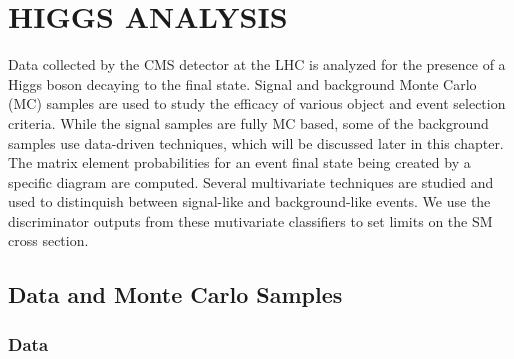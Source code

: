%
%
%



\chapter{\texorpdfstring{\uppercase {Higgs Analysis}}{Higgs Analysis}}
\label{ch:analysis}

Data collected by the CMS detector at the LHC is analyzed for the presence of a Higgs boson decaying to the \lvjj final state.
Signal and background Monte Carlo (MC) samples are used to study the efficacy of various object and event selection criteria.
While the signal samples are fully MC based, some of the background samples use data-driven techniques, which will be discussed later in this chapter.
The matrix element probabilities for an event final state being created by a specific diagram are computed.
Several multivariate techniques are studied and used to distinquish between signal-like and background-like events.
We use the discriminator outputs from these mutivariate classifiers to set limits on the SM \HWW cross section.

\section{Data and Monte Carlo Samples}


\subsection{Data}
\label{sec:data}

